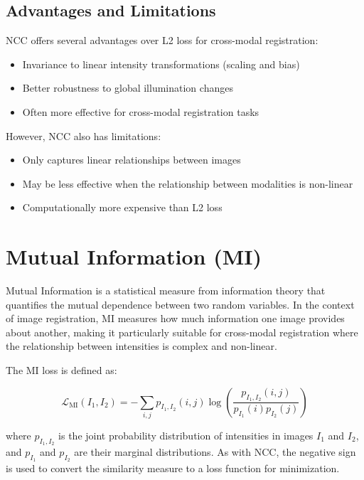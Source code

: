 \subsection{Advantages and Limitations}

NCC offers several advantages over L2 loss for cross-modal registration:
\begin{itemize}
    \item Invariance to linear intensity transformations (scaling and bias)
    \item Better robustness to global illumination changes
    \item Often more effective for cross-modal registration tasks \parencite{nccreg}
\end{itemize}

However, NCC also has limitations:
\begin{itemize}
    \item Only captures linear relationships between images
    \item May be less effective when the relationship between modalities is non-linear
    \item Computationally more expensive than L2 loss
\end{itemize}

\section{Mutual Information (MI)}

Mutual Information is a statistical measure from information theory that quantifies the mutual dependence between two random variables. In the context of image registration, MI measures how much information one image provides about another, making it particularly suitable for cross-modal registration where the relationship between intensities is complex and non-linear.

The MI loss is defined as:

\begin{equation}
    \mathcal{L}_{\text{MI}}(I_1, I_2) = -\sum_{i,j} p_{I_1,I_2}(i,j) \log\left(\frac{p_{I_1,I_2}(i,j)}{p_{I_1}(i)p_{I_2}(j)}\right)
\end{equation}

where $p_{I_1,I_2}$ is the joint probability distribution of intensities in images $I_1$ and $I_2$, and $p_{I_1}$ and $p_{I_2}$ are their marginal distributions. As with NCC, the negative sign is used to convert the similarity measure to a loss function for minimization.

